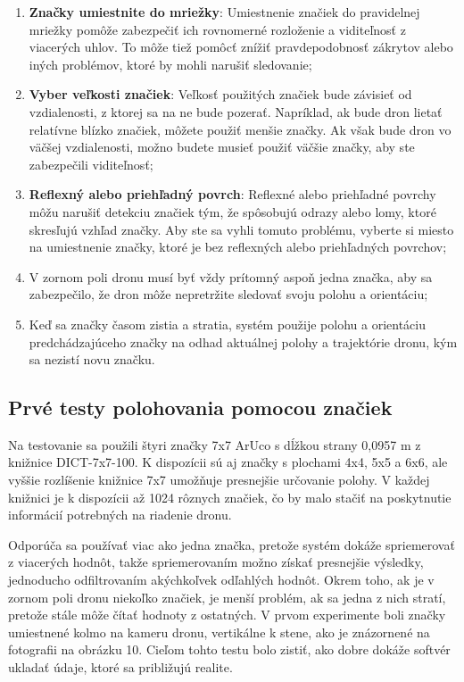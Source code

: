 {\begin{enumerate}
\item \textbf{Značky umiestnite do mriežky}: Umiestnenie značiek do pravidelnej mriežky pomôže zabezpečiť ich rovnomerné rozloženie a viditeľnosť z viacerých uhlov. To môže tiež pomôcť znížiť pravdepodobnosť zákrytov alebo iných problémov, ktoré by mohli narušiť sledovanie;

\item \textbf{Vyber veľkosti značiek}: Veľkosť použitých značiek bude závisieť od vzdialenosti, z ktorej sa na ne bude pozerať. Napríklad, ak bude dron lietať relatívne blízko značiek, môžete použiť menšie značky. Ak však bude dron vo väčšej vzdialenosti, možno budete musieť použiť väčšie značky, aby ste zabezpečili viditeľnosť;

\item \textbf{Reflexný alebo priehľadný povrch}: Reflexné alebo priehľadné povrchy môžu narušiť detekciu značiek tým, že spôsobujú odrazy alebo lomy, ktoré skresľujú vzhľad značky. Aby ste sa vyhli tomuto problému, vyberte si miesto na umiestnenie značky, ktoré je bez reflexných alebo priehľadných povrchov;

\item V zornom poli dronu musí byť vždy prítomný aspoň jedna značka, aby sa zabezpečilo, že dron môže nepretržite sledovať svoju polohu a orientáciu;

\item Keď sa značky časom zistia a stratia, systém použije polohu a orientáciu predchádzajúceho značky na odhad aktuálnej polohy a trajektórie dronu, kým sa nezistí novu značku.
\end{enumerate}


\subsection{Prvé testy polohovania pomocou značiek}
Na testovanie sa použili štyri značky 7x7 ArUco s dĺžkou strany 0,0957 m z knižnice DICT-7x7-100. K dispozícii sú aj značky s plochami 4x4, 5x5 a 6x6, ale vyššie rozlíšenie knižnice 7x7 umožňuje presnejšie určovanie polohy. V každej knižnici je k dispozícii až 1024 rôznych značiek, čo by malo stačiť na poskytnutie informácií potrebných na riadenie dronu.

Odporúča sa používať viac ako jedna značka, pretože systém dokáže spriemerovať z viacerých hodnôt, takže spriemerovaním možno získať presnejšie výsledky, jednoducho odfiltrovaním akýchkoľvek odľahlých hodnôt. Okrem toho, ak je v zornom poli dronu niekoľko značiek, je menší problém, ak sa jedna z nich stratí, pretože stále môže čítať hodnoty z ostatných. V prvom experimente boli značky umiestnené kolmo na kameru dronu, vertikálne k stene, ako je znázornené na fotografii na obrázku 10. Cieľom tohto testu bolo zistiť, ako dobre dokáže softvér ukladať údaje, ktoré sa približujú realite.

}

